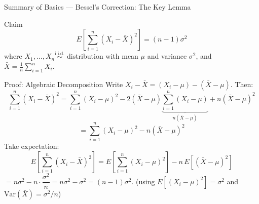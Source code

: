 \documentclass{beamer}
\begin{document}
\begin{frame}[shrink=35]{Summary of Basics --- Bessel's Correction: The Key Lemma}
  \begin{block}{Claim}
    \[
      E\!\left[\sum_{i=1}^n (X_i - \bar{X})^2\right] = (n-1)\sigma^2
    \]
    where $X_1,\ldots,X_n \overset{\text{i.i.d.}}{\sim}$ distribution
    with mean $\mu$ and variance $\sigma^2$,
    and $\bar{X} = \frac{1}{n}\sum_{i=1}^n X_i$.
  \end{block}

  \begin{block}{Proof: Algebraic Decomposition}
    Write $X_i - \bar{X} = (X_i - \mu) - (\bar{X} - \mu)$.
    Then:
    \[
      \sum_{i=1}^n(X_i - \bar{X})^2
        = \sum_{i=1}^n(X_i-\mu)^2
          - 2(\bar{X}-\mu)\underbrace{\sum_{i=1}^n(X_i-\mu)}_{n(\bar{X}-\mu)}
          + n(\bar{X}-\mu)^2
    \]
    \[
      = \sum_{i=1}^n(X_i-\mu)^2 - n(\bar{X}-\mu)^2
    \]
    Take expectation:
    \[
      E\!\left[\sum_{i=1}^n(X_i-\bar{X})^2\right]
        = E\!\left[\sum_{i=1}^n(X_i-\mu)^2\right]
          - n\,E\!\left[(\bar{X}-\mu)^2\right]
    \]
    $= n\sigma^2 - n\cdot\dfrac{\sigma^2}{n} = n\sigma^2 - \sigma^2
    = (n-1)\sigma^2$.
    \hfill (using $E[(X_i-\mu)^2]=\sigma^2$ and
    $\mathrm{Var}(\bar{X})=\sigma^2/n$)
  \end{block}
\end{frame}
\end{document}
